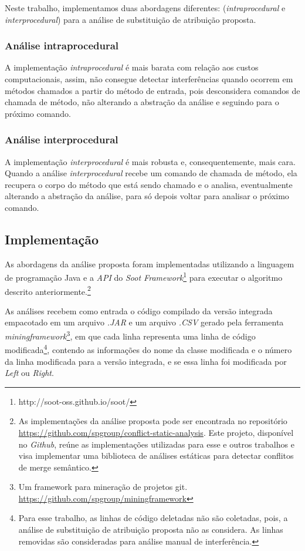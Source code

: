 Neste trabalho, implementamos duas abordagens diferentes: (\emph{intraprocedural} e \emph{interprocedural}) para a análise de substituição de atribuição proposta.

\subsubsection*{Análise intraprocedural}

A implementação \emph{intraprocedural} é mais barata com relação aos custos computacionais, assim, não consegue detectar interferências quando ocorrem em métodos chamados a partir do método de entrada, pois desconsidera comandos de chamada de método, não alterando a abstração da análise e seguindo para o próximo comando.

\subsubsection*{Análise interprocedural}

A implementação \emph{interprocedural} é mais robusta e, consequentemente, mais cara. Quando a análise \emph{interprocedural} recebe um comando de chamada de método, ela recupera o corpo do método que está sendo chamado e o analisa, eventualmente alterando a abstração da análise, para só depois voltar para analisar o próximo comando. 


\subsection{Implementação}
As abordagens da análise proposta foram implementadas utilizando a linguagem de programação Java e a \emph{API} do \emph{Soot Framework}\footnote{http://soot-oss.github.io/soot/} para executar o algoritmo descrito anteriormente.\footnote{As implementações da análise proposta pode ser encontrada no repositório \href{https://github.com/spgroup/conflict-static-analysis}{https://github.com/spgroup/conflict-static-analysis}. Este projeto, disponível no \emph{Github}, reúne as implementações utilizadas para esse e outros trabalhos e visa implementar uma biblioteca de análises estáticas para detectar conflitos de merge semântico.} 

As análises recebem como entrada o código compilado da versão integrada empacotado em um arquivo \emph{.JAR} e um arquivo \emph{.CSV} gerado pela ferramenta \emph{miningframework}\footnote{Um framework para mineração de projetos git. \href{https://github.com/spgroup/miningframework}{https://github.com/spgroup/miningframework}}, em que cada linha representa uma linha de código modificada\footnote{Para esse trabalho, as linhas de código deletadas não são coletadas, pois, a análise de substituição de atribuição proposta não as considera. As linhas removidas são consideradas para análise manual de interferência.}, contendo as informações do nome da classe modificada e o número da linha modificada para a versão integrada, e se essa linha foi modificada por \emph{Left} ou \emph{Right}.